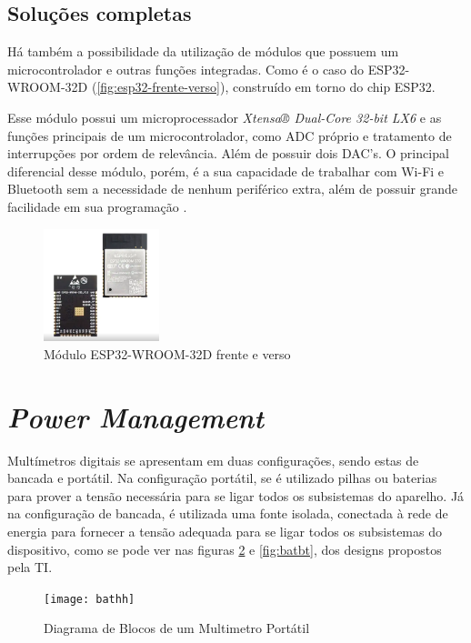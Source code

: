 \subsection{Soluções completas}\label{subsec:solucomp}

Há também a possibilidade da utilização de módulos que possuem um microcontrolador e outras funções integradas. Como é o caso do ESP32-WROOM-32D (\autoref{fig:esp32-frente-verso}), construído em torno do chip ESP32.

Esse módulo possui um microprocessador \textit{Xtensa® Dual-Core 32-bit LX6} e as funções principais de um microcontrolador, como \gls{ADC} próprio e tratamento de interrupções por ordem de relevância. Além de possuir dois \gls{DAC}'s. O principal diferencial desse módulo, porém, é a sua capacidade de trabalhar com Wi-Fi e Bluetooth sem a necessidade de nenhum periférico extra, além de possuir grande facilidade em sua programação \cite{esp32-datasheet}.

\begin{figure}[htb!]
    \caption{Módulo ESP32-WROOM-32D frente e verso}
    \label{fig:esp32-frente-verso}
    \includegraphics[width=0.3\textwidth]{figuras/esp32-frente-verso.png}
\end{figure}

\section{\textit{Power Management}}\label{powerManagement}

Multímetros digitais se apresentam em duas configurações, sendo estas de bancada e portátil. Na configuração portátil, se é utilizado pilhas ou baterias para prover a tensão necessária para se ligar todos os subsistemas do aparelho. Já na configuração de bancada, é utilizada uma fonte isolada, conectada à rede de energia para fornecer a tensão adequada para se ligar todos os subsistemas do dispositivo, como se pode ver nas figuras \ref{fig:bathh} e \ref{fig:batbt}, dos designs propostos pela \gls{TI}.

\begin{figure}[htb!]%
    \caption{Diagrama de Blocos de um Multimetro Portátil}%
    \label{fig:bathh}%
    \texttt{[image: bathh]}%
\end{figure}

